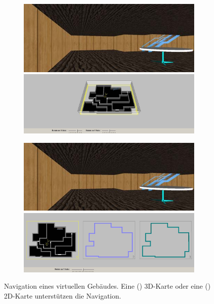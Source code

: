 \begin{figure}
	\centering
	\begin{subfigure}{0.49\textwidth}
		\includegraphics[width=\textwidth]{figures/chittaro2006_ve.png}
		\includegraphics[width=\textwidth]{figures/chittaro2006_3dm.png}
		\caption{}
		\label{sfig:chittaro2006_3dm}
    \end{subfigure}
    \hfill
	\begin{subfigure}{0.49\textwidth}
		\includegraphics[width=\textwidth]{figures/chittaro2006_ve.png}
		\includegraphics[width=\textwidth]{figures/chittaro2006_2dm.png}
		\caption{}
		\label{sfig:chittaro2006_2dm}
	\end{subfigure}
	\caption{Navigation eines virtuellen Gebäudes. Eine () 3D-Karte oder eine () 2D-Karte unterstützen die Navigation. }
	\label{fig:chittaro2006_maps}
\end{figure}

